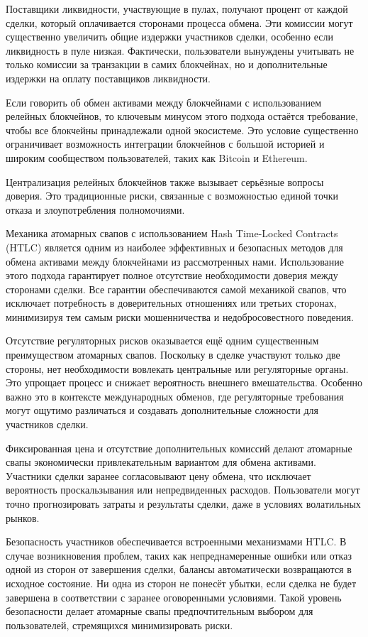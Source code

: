 Поставщики ликвидности, участвующие в пулах, получают процент от каждой сделки, который оплачивается сторонами процесса обмена. Эти комиссии могут существенно увеличить общие издержки участников сделки, особенно если ликвидность в пуле низкая. Фактически, пользователи вынуждены учитывать не только комиссии за транзакции в самих блокчейнах, но и дополнительные издержки на оплату поставщиков ликвидности.

Если говорить об обмен активами между блокчейнами с использованием релейных блокчейнов, то ключевым минусом этого подхода остаётся требование, чтобы все блокчейны принадлежали одной экосистеме. Это условие существенно ограничивает возможность интеграции блокчейнов с большой историей и широким сообществом пользователей, таких как Bitcoin и Ethereum.

Централизация релейных блокчейнов также вызывает серьёзные вопросы доверия. Это традиционные риски, связанные с возможностью единой точки отказа и злоупотребления полномочиями.

Механика атомарных свапов с использованием Hash Time-Locked Contracts (HTLC) является одним из наиболее эффективных и безопасных методов для обмена активами между блокчейнами из рассмотренных нами. Использование этого подхода гарантирует полное отсутствие необходимости доверия между сторонами сделки. Все гарантии обеспечиваются самой механикой свапов, что исключает потребность в доверительных отношениях или третьих сторонах, минимизируя тем самым риски мошенничества и недобросовестного поведения.

Отсутствие регуляторных рисков оказывается ещё одним существенным преимуществом атомарных свапов. Поскольку в сделке участвуют только две стороны, нет необходимости вовлекать центральные или регуляторные органы. Это упрощает процесс и снижает вероятность внешнего вмешательства. Особенно важно это в контексте международных обменов, где регуляторные требования могут ощутимо различаться и создавать дополнительные сложности для участников сделки.

Фиксированная цена и отсутствие дополнительных комиссий делают атомарные свапы экономически привлекательным вариантом для обмена активами. Участники сделки заранее согласовывают цену обмена, что исключает вероятность проскальзывания или непредвиденных расходов. Пользователи могут точно прогнозировать затраты и результаты сделки, даже в условиях волатильных рынков.

Безопасность участников обеспечивается встроенными механизмами HTLC. В случае возникновения проблем, таких как непреднамеренные ошибки или отказ одной из сторон от завершения сделки, балансы автоматически возвращаются в исходное состояние. Ни одна из сторон не понесёт убытки, если сделка не будет завершена в соответствии с заранее оговоренными условиями. Такой уровень безопасности делает атомарные свапы предпочтительным выбором для пользователей, стремящихся минимизировать риски.

